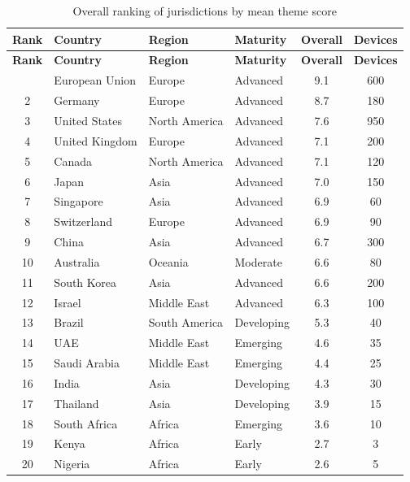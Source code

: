 \begin{longtable}{@{}c l l l c c@{}}
\caption[Overall ranking of jurisdictions]{Overall ranking of jurisdictions by mean theme score} \label{tab:overall-rank} \\
\toprule
\textbf{Rank} & \textbf{Country} & \textbf{Region} & \textbf{Maturity} & \textbf{Overall} & \textbf{Devices} \\
\midrule
\endfirsthead
\toprule
\textbf{Rank} & \textbf{Country} & \textbf{Region} & \textbf{Maturity} & \textbf{Overall} & \textbf{Devices} \\
\midrule
\endhead
\bottomrule
\endfoot
1 & European Union & Europe & Advanced & 9.1 & 600 \\
2 & Germany & Europe & Advanced & 8.7 & 180 \\
3 & United States & North America & Advanced & 7.6 & 950 \\
4 & United Kingdom & Europe & Advanced & 7.1 & 200 \\
5 & Canada & North America & Advanced & 7.1 & 120 \\
6 & Japan & Asia & Advanced & 7.0 & 150 \\
7 & Singapore & Asia & Advanced & 6.9 & 60 \\
8 & Switzerland & Europe & Advanced & 6.9 & 90 \\
9 & China & Asia & Advanced & 6.7 & 300 \\
10 & Australia & Oceania & Moderate & 6.6 & 80 \\
11 & South Korea & Asia & Advanced & 6.6 & 200 \\
12 & Israel & Middle East & Advanced & 6.3 & 100 \\
13 & Brazil & South America & Developing & 5.3 & 40 \\
14 & UAE & Middle East & Emerging & 4.6 & 35 \\
15 & Saudi Arabia & Middle East & Emerging & 4.4 & 25 \\
16 & India & Asia & Developing & 4.3 & 30 \\
17 & Thailand & Asia & Developing & 3.9 & 15 \\
18 & South Africa & Africa & Emerging & 3.6 & 10 \\
19 & Kenya & Africa & Early & 2.7 & 3 \\
20 & Nigeria & Africa & Early & 2.6 & 5 \\
\end{longtable}